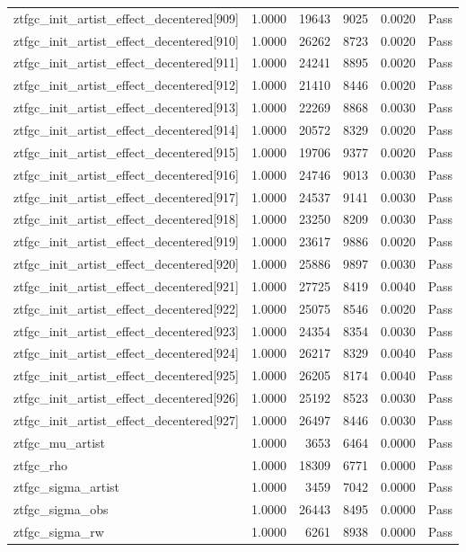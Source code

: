 \begin{table}[htbp]
\begin{tabular}{llrrll}
ztfgc\_init\_artist\_effect\_decentered[909] & 1.0000 & 19643 & 9025 & 0.0020 & Pass \\
ztfgc\_init\_artist\_effect\_decentered[910] & 1.0000 & 26262 & 8723 & 0.0020 & Pass \\
ztfgc\_init\_artist\_effect\_decentered[911] & 1.0000 & 24241 & 8895 & 0.0020 & Pass \\
ztfgc\_init\_artist\_effect\_decentered[912] & 1.0000 & 21410 & 8446 & 0.0020 & Pass \\
ztfgc\_init\_artist\_effect\_decentered[913] & 1.0000 & 22269 & 8868 & 0.0030 & Pass \\
ztfgc\_init\_artist\_effect\_decentered[914] & 1.0000 & 20572 & 8329 & 0.0020 & Pass \\
ztfgc\_init\_artist\_effect\_decentered[915] & 1.0000 & 19706 & 9377 & 0.0020 & Pass \\
ztfgc\_init\_artist\_effect\_decentered[916] & 1.0000 & 24746 & 9013 & 0.0030 & Pass \\
ztfgc\_init\_artist\_effect\_decentered[917] & 1.0000 & 24537 & 9141 & 0.0030 & Pass \\
ztfgc\_init\_artist\_effect\_decentered[918] & 1.0000 & 23250 & 8209 & 0.0030 & Pass \\
ztfgc\_init\_artist\_effect\_decentered[919] & 1.0000 & 23617 & 9886 & 0.0020 & Pass \\
ztfgc\_init\_artist\_effect\_decentered[920] & 1.0000 & 25886 & 9897 & 0.0030 & Pass \\
ztfgc\_init\_artist\_effect\_decentered[921] & 1.0000 & 27725 & 8419 & 0.0040 & Pass \\
ztfgc\_init\_artist\_effect\_decentered[922] & 1.0000 & 25075 & 8546 & 0.0020 & Pass \\
ztfgc\_init\_artist\_effect\_decentered[923] & 1.0000 & 24354 & 8354 & 0.0030 & Pass \\
ztfgc\_init\_artist\_effect\_decentered[924] & 1.0000 & 26217 & 8329 & 0.0040 & Pass \\
ztfgc\_init\_artist\_effect\_decentered[925] & 1.0000 & 26205 & 8174 & 0.0040 & Pass \\
ztfgc\_init\_artist\_effect\_decentered[926] & 1.0000 & 25192 & 8523 & 0.0030 & Pass \\
ztfgc\_init\_artist\_effect\_decentered[927] & 1.0000 & 26497 & 8446 & 0.0030 & Pass \\
ztfgc\_mu\_artist & 1.0000 & 3653 & 6464 & 0.0000 & Pass \\
ztfgc\_rho & 1.0000 & 18309 & 6771 & 0.0000 & Pass \\
ztfgc\_sigma\_artist & 1.0000 & 3459 & 7042 & 0.0000 & Pass \\
ztfgc\_sigma\_obs & 1.0000 & 26443 & 8495 & 0.0000 & Pass \\
ztfgc\_sigma\_rw & 1.0000 & 6261 & 8938 & 0.0000 & Pass \\
\bottomrule
\end{tabular}
\end{table}
